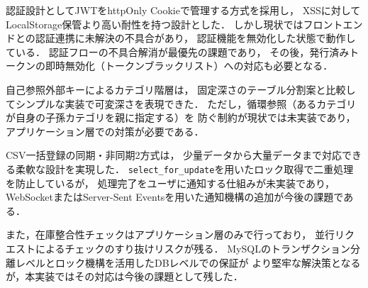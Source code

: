 \documentclass[submit,techrep]{ipsj}
\begin{document}
認証設計としてJWTをhttpOnly Cookieで管理する方式を採用し，
XSSに対してLocalStorage保管より高い耐性を持つ設計とした．
しかし現状ではフロントエンドとの認証連携に未解決の不具合があり，
認証機能を無効化した状態で動作している．
認証フローの不具合解消が最優先の課題であり，
その後，発行済みトークンの即時無効化（トークンブラックリスト）への対応も必要となる．

自己参照外部キーによるカテゴリ階層は，
固定深さのテーブル分割案と比較してシンプルな実装で可変深さを表現できた．
ただし，循環参照（あるカテゴリが自身の子孫カテゴリを親に指定する）を
防ぐ制約が現状では未実装であり，アプリケーション層での対策が必要である．

CSV一括登録の同期・非同期2方式は，
少量データから大量データまで対応できる柔軟な設計を実現した．
\texttt{select\_for\_update}を用いたロック取得で二重処理を防止しているが，
処理完了をユーザに通知する仕組みが未実装であり，
WebSocketまたはServer-Sent Eventsを用いた通知機構の追加が今後の課題である．

また，在庫整合性チェックはアプリケーション層のみで行っており，
並行リクエストによるチェックのすり抜けリスクが残る．
MySQLのトランザクション分離レベルとロック機構を活用したDBレベルでの保証が
より堅牢な解決策となるが，本実装ではその対応は今後の課題として残した．


\end{document}
